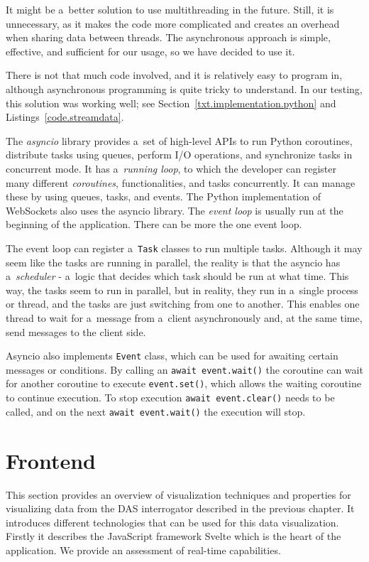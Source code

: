 It might be a~better solution to use multithreading in the future. Still, it is unnecessary, as it makes the code more complicated and creates an overhead when sharing data between threads. The asynchronous approach is simple, effective, and sufficient for our usage, so we have decided to use it.

There is not that much code involved, and it is relatively easy to program in, although asynchronous programming is quite tricky to understand. In our testing, this solution was working well; see Section~\ref{txt.implementation.python} and Listings~\ref{code.streamdata}.

The \textit{asyncio} library provides a~set of high-level APIs to run Python coroutines, distribute tasks using queues, perform I/O operations, and synchronize tasks in concurrent mode. It has a~\textit{running loop}, to which the developer can register many different \textit{coroutines}, functionalities, and tasks concurrently. It can manage these by using queues, tasks, and events. The Python implementation of WebSockets also uses the asyncio library. The \textit{event loop} is usually run at the beginning of the application. There can be more the one event loop. 

The event loop can register a~\texttt{Task} classes to run multiple tasks. Although it may seem like the tasks are running in parallel, the reality is that the asyncio has a~\textit{scheduler} - a~logic that decides which task should be run at what time. This way, the tasks seem to run in parallel, but in reality, they run in a~single process or thread, and the tasks are just switching from one to another. This enables one thread to wait for a~message from a~client asynchronously and, at the same time, send messages to the client side.

Asyncio also implements \texttt{Event} class, which can be used for awaiting certain messages or conditions. By calling an \texttt{await event.wait()} the coroutine can wait for another coroutine to execute \texttt{event.set()}, which allows the waiting coroutine to continue execution. To stop execution \texttt{await event.clear()} needs to be called, and on the next \texttt{await event.wait()} the execution will stop.

\section{Frontend}\label{txt.design.frontend}

This section provides an overview of visualization techniques and properties for visualizing data from the DAS interrogator described in the previous chapter. It introduces different technologies that can be used for this data visualization. Firstly it describes the JavaScript framework Svelte which is the heart of the application. We provide an assessment of real-time capabilities.

